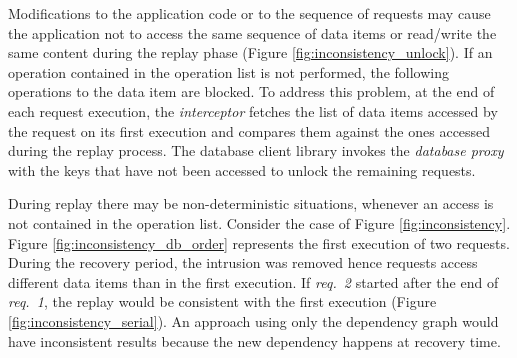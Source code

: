 \documentclass[10pt,conference]{IEEEtran}
\begin{document}
Modifications to the application code or to the sequence of requests may cause the application not to access the same sequence of data items or read/write the same content during the replay phase (Figure \ref{fig:inconsistency_unlock}). If an operation contained in the operation list is not performed, the following operations to the data item are blocked. To address this problem, at the end of each request execution, the \textit{interceptor} fetches the list of data items accessed by the request on its first execution and compares them against the ones accessed during the replay process. The database client library invokes the \emph{database proxy} with the keys that have not been accessed to unlock the remaining requests. 



During replay there may be non-deterministic situations, whenever an access is not contained in the operation list. Consider the case of Figure \ref{fig:inconsistency}. Figure \ref{fig:inconsistency_db_order} represents the first execution of two requests. During the recovery period, the intrusion was removed hence requests access different data items than in the first execution. If \emph{req.~2} started after the end of \emph{req.~1}, the replay would be consistent with the first execution (Figure \ref{fig:inconsistency_serial}). An approach using only the dependency graph would have inconsistent results because the new dependency happens at recovery time.
\end{document}
